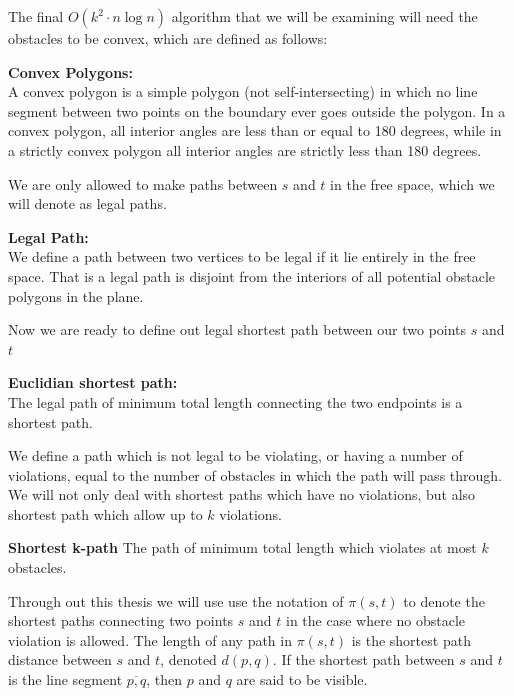 The final $O(k^2 \cdot n \log n)$ algorithm that we will be examining will  
need the obstacles to be convex, which are defined as follows: 

\begin{mydef}
	\textbf{Convex Polygons:} \\ 
	A convex polygon is a simple polygon (not self-intersecting) in which no
	line segment between two points on the boundary ever goes outside the
	polygon. In a convex polygon, all interior angles are less than or equal to
	180 degrees, while in a strictly convex polygon all interior angles are
	strictly less than 180 degrees.
	\cite{Bisector-collinearity-convexPoly} 
\end{mydef}

We are only allowed to make paths between $s$ and $t$ in the free space, which we 
will denote as legal paths.

\begin{mydef}
	\textbf{Legal Path:}\\ 
	We define a path between two vertices to be
	legal if it lie entirely in the free space. That is a legal path is disjoint
	from the interiors of all potential obstacle polygons in the plane.
\end{mydef}

Now we are ready to define out legal shortest path between our two points $s$ and 
$t$

\begin{mydef}
	\textbf{Euclidian shortest path:}\\ 
	The legal path of minimum total length connecting the two endpoints is a 
    shortest path.  
\end{mydef}

We define a path which is not legal to be violating, or having a number of
violations, equal to the number of obstacles in which the path will pass
through. We will not only deal with shortest paths which have no violations,
but also shortest path which allow up to $k$ violations.

\begin{mydef}
	\textbf{Shortest k-path}
	The path of minimum total length which violates at most $k$ obstacles.
\end{mydef}

Through out this thesis we will use use the notation of $\pi(s,t)$ to denote the 
shortest paths connecting two points $s$ and $t$ in the case where no obstacle 
violation is allowed. The length of any path in	$\pi(s,t)$ is the shortest path 
distance between $s$ and $t$, denoted $d(p,q)$. If the shortest path between $s$ 
and $t$ is the line segment $\overline{p,q}$, then $p$ and $q$ are said to be 
visible. 

